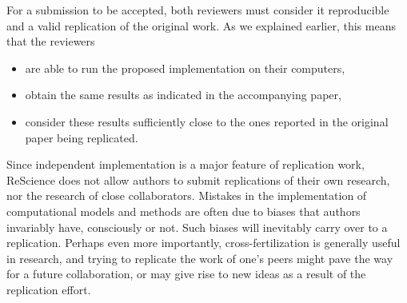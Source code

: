 \documentclass[a4paper,10pt, twocolumn]{article}
\begin{document}
For a submission to be accepted, both reviewers must consider it
reproducible and a valid replication of the original work. As we
explained earlier, this means that the reviewers
\begin{itemize}
\item are able to run the proposed implementation on their computers,
\item obtain the same results as indicated in the accompanying paper,
\item consider these results sufficiently close to the ones reported in the original paper being replicated.
\end{itemize}
%

Since independent implementation is a major feature of replication
work, ReScience does not allow authors to submit replications of their
own research, nor the research of close collaborators. Mistakes in the
implementation of computational models and methods are often due to
biases that authors invariably have, consciously or not. Such biases
will inevitably carry over to a replication. Perhaps even more
importantly, cross-fertilization is generally useful in research, and
trying to replicate the work of one’s peers might pave the way for a
future collaboration, or may give rise to new ideas as a result of the
replication effort.



\end{document}
